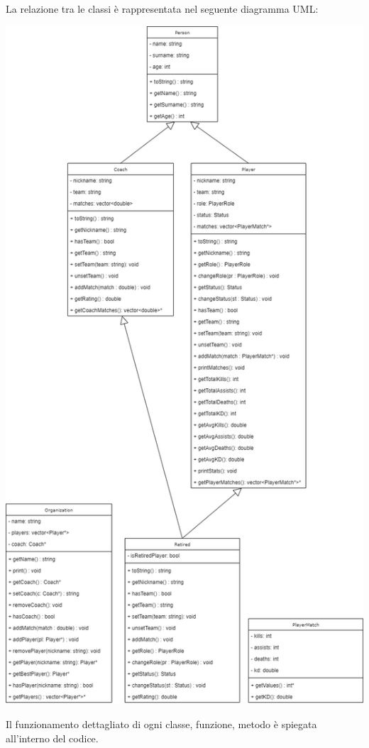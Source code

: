\documentclass[a4paper, 11pt]{article}
\begin{document}
La relazione tra le classi è rappresentata nel seguente diagramma UML:

\begin{center}
\includegraphics[height=\textheight]{uml}
\end{center}

Il funzionamento dettagliato di ogni classe, funzione, metodo è spiegata all'interno del codice.
\end{document}
